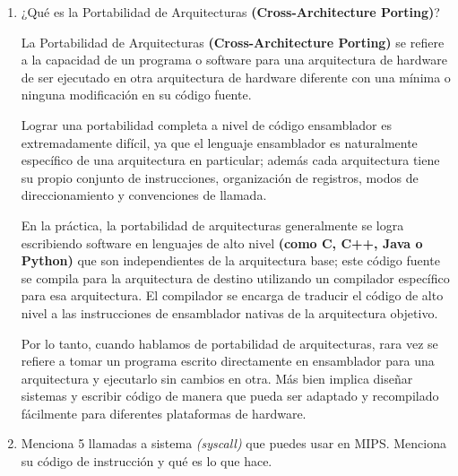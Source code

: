 \documentclass[12pt,letterpaper]{article}
\begin{document}
\begin{enumerate}
\item ¿Qué es la Portabilidad de Arquitecturas \textbf{(Cross-Architecture Porting)}?
  \bigskip

  La Portabilidad de Arquitecturas \textbf{(Cross-Architecture Porting)} se refiere a la capacidad de un programa o software para una arquitectura de hardware de ser ejecutado en otra arquitectura de hardware diferente con una mínima o ninguna modificación en su código fuente.

  Lograr una portabilidad completa a nivel de código ensamblador es extremadamente difícil, ya que el lenguaje ensamblador es naturalmente específico de una arquitectura en particular; además cada arquitectura tiene su propio conjunto de instrucciones, organización de registros, modos de direccionamiento y convenciones de llamada.
  
  En la práctica, la portabilidad de arquitecturas generalmente se logra escribiendo software en lenguajes de alto nivel \textbf{(como C, C++, Java o Python)} que son independientes de la arquitectura base; este código fuente se compila para la arquitectura de destino utilizando un compilador específico para esa arquitectura. El compilador se encarga de traducir el código de alto nivel a las instrucciones de ensamblador nativas de la arquitectura objetivo.

  Por lo tanto, cuando hablamos de portabilidad de arquitecturas, rara vez se refiere a tomar un programa escrito directamente en ensamblador para una arquitectura y ejecutarlo sin cambios en otra. Más bien implica diseñar sistemas y escribir código de manera que pueda ser adaptado y recompilado fácilmente para diferentes plataformas de hardware.
  \bigskip
  
\item Menciona 5 llamadas a sistema \textit{(syscall)} que puedes usar en MIPS. Menciona su código de instrucción y qué es lo que hace.
  \bigskip


\end{enumerate}
\end{document}
